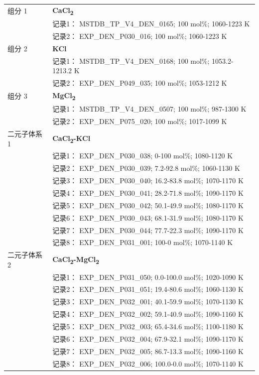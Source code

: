 \documentclass[12pt]{article}
\begin{document}
{\begin{longtable}[]{@{}
  >{\raggedright\arraybackslash}p{}
  >{\raggedright\arraybackslash}p{}@{}}
组分 1  & \textbf{CaCl\textsubscript{2}} \\
 & 记录1： MSTDB\_TP\_V4\_DEN\_0165; 100 mol\%; 1060-1223 K \\
 & 记录2： EXP\_DEN\_P030\_016; 100 mol\%; 1060-1223 K  \\

组分 2  & \textbf{KCl} \\
 & 记录1： MSTDB\_TP\_V4\_DEN\_0168; 100 mol\%; 1053.2-1213.2 K \\
 & 记录2： EXP\_DEN\_P049\_035; 100 mol\%; 1053-1212 K  \\

组分 3  & \textbf{MgCl\textsubscript{2}} \\
 & 记录1： MSTDB\_TP\_V4\_DEN\_0507; 100 mol\%; 987-1300 K \\
 & 记录2： EXP\_DEN\_P075\_020; 100 mol\%; 1017-1099 K  \\

二元子体系 1  & \textbf{CaCl\textsubscript{2}-KCl} \\
 & 记录1： EXP\_DEN\_P030\_038; 0-100 mol\%; 1080-1120 K \\
 & 记录2： EXP\_DEN\_P030\_039; 7.2-92.8 mol\%; 1060-1130 K \\
 & 记录3： EXP\_DEN\_P030\_040; 16.2-83.8 mol\%; 1070-1170 K \\
 & 记录4： EXP\_DEN\_P030\_041; 28.2-71.8 mol\%; 1090-1170 K \\
 & 记录5： EXP\_DEN\_P030\_042; 50.1-49.9 mol\%; 1080-1170 K \\
 & 记录6： EXP\_DEN\_P030\_043; 68.1-31.9 mol\%; 1080-1170 K \\
 & 记录7： EXP\_DEN\_P030\_044; 77.7-22.3 mol\%; 1090-1170 K \\
 & 记录8： EXP\_DEN\_P031\_001; 100-0 mol\%; 1070-1140 K  \\

二元子体系 2  & \textbf{CaCl\textsubscript{2}-MgCl\textsubscript{2}} \\
 & 记录1： EXP\_DEN\_P031\_050; 0.0-100.0 mol\%; 1020-1090 K \\
 & 记录2： EXP\_DEN\_P031\_051; 19.4-80.6 mol\%; 1060-1130 K \\
 & 记录3： EXP\_DEN\_P032\_001; 40.1-59.9 mol\%; 1070-1130 K \\
 & 记录4： EXP\_DEN\_P032\_002; 59.1-40.9 mol\%; 1090-1160 K \\
 & 记录5： EXP\_DEN\_P032\_003; 65.4-34.6 mol\%; 1100-1180 K \\
 & 记录6： EXP\_DEN\_P032\_004; 67.9-32.1 mol\%; 1090-1170 K \\
 & 记录7： EXP\_DEN\_P032\_005; 86.7-13.3 mol\%; 1090-1160 K \\
 & 记录8： EXP\_DEN\_P032\_006; 100.0-0.0 mol\%; 1070-1140 K  \\


\end{longtable}}
\end{document}
